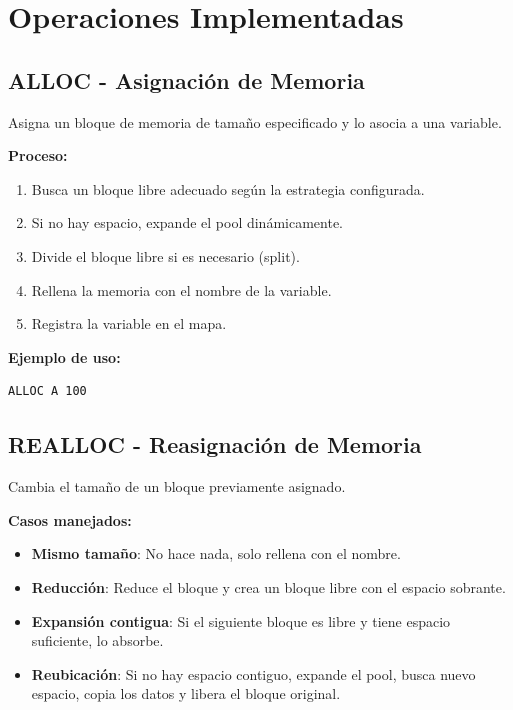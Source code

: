 \documentclass[12pt,a4paper]{article}
\begin{document}
\section{Operaciones Implementadas}

\subsection{ALLOC - Asignación de Memoria}

Asigna un bloque de memoria de tamaño especificado y lo asocia a una variable.

\textbf{Proceso:}
\begin{enumerate}
    \item Busca un bloque libre adecuado según la estrategia configurada.
    \item Si no hay espacio, expande el pool dinámicamente.
    \item Divide el bloque libre si es necesario (split).
    \item Rellena la memoria con el nombre de la variable.
    \item Registra la variable en el mapa.
\end{enumerate}

\textbf{Ejemplo de uso:}
\begin{lstlisting}
ALLOC A 100
\end{lstlisting}

\subsection{REALLOC - Reasignación de Memoria}

Cambia el tamaño de un bloque previamente asignado.

\textbf{Casos manejados:}
\begin{itemize}
    \item \textbf{Mismo tamaño}: No hace nada, solo rellena con el nombre.
    \item \textbf{Reducción}: Reduce el bloque y crea un bloque libre con el espacio sobrante.
    \item \textbf{Expansión contigua}: Si el siguiente bloque es libre y tiene espacio suficiente, lo absorbe.
    \item \textbf{Reubicación}: Si no hay espacio contiguo, expande el pool, busca nuevo espacio, copia los datos y libera el bloque original.
\end{itemize}
\end{document}
